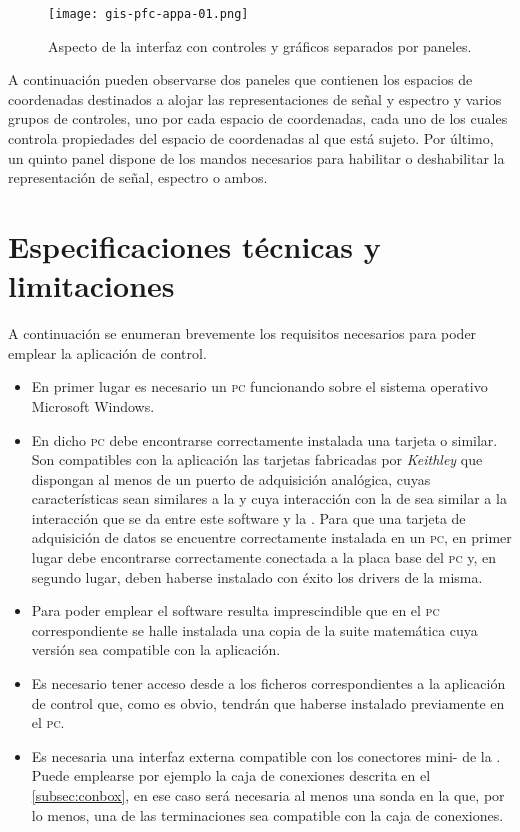 \begin{figure}
	\begin{center}
		\texttt{[image: gis-pfc-appa-01.png]}
	\end{center}
	\caption[Aspecto de la interfaz con controles y gráficos separados
	por paneles]{Aspecto de la interfaz con controles y gráficos
	separados por paneles.}
	\label{fig:interface}
\end{figure}

A continuación pueden observarse dos paneles que contienen los espacios de
coordenadas destinados a alojar las representaciones de señal y espectro y
varios grupos de controles, uno por cada espacio de coordenadas, cada uno
de los cuales controla propiedades del espacio de coordenadas al que está
sujeto. Por último, un quinto panel dispone de los mandos necesarios para
habilitar o deshabilitar la representación de señal, espectro o ambos.


\section{Especificaciones técnicas y limitaciones}

A continuación se enumeran brevemente los requisitos necesarios para poder
emplear la aplicación de control.

\begin{itemize}
	\item En primer lugar es necesario un \textsc{pc} funcionando sobre
		el sistema operativo Microsoft Windows.
	\item En dicho \textsc{pc} debe encontrarse correctamente instalada
		una tarjeta \kpci{} o similar. Son compatibles con la
		aplicación las tarjetas fabricadas por \emph{Keithley} que
		dispongan al menos de un puerto de adquisición analógica,
		cuyas características sean similares a la \kpci{} y cuya
		interacción con la \datx{} de \matlab{} sea similar a la
		interacción que se da entre este software y la \kpci{}.
		Para que una tarjeta de adquisición de datos se encuentre
		correctamente instalada en un \textsc{pc}, en primer lugar
		debe encontrarse correctamente conectada a la placa base
		del \textsc{pc} y, en segundo lugar, deben haberse
		instalado con éxito los drivers de la misma.
	\item Para poder emplear el software resulta imprescindible que en
		el \textsc{pc} correspondiente se halle instalada una copia
		de la suite matemática \matlab{} cuya versión sea
		compatible con la aplicación.
	\item Es necesario tener acceso desde \matlab{} a los ficheros
		correspondientes a la aplicación de control que, como es
		obvio, tendrán que haberse instalado previamente en el
		\textsc{pc}.
	\item Es necesaria una interfaz externa compatible con los
		conectores mini- de la \kpci{}. Puede emplearse por
		ejemplo la caja de conexiones descrita en el
		\vref{subsec:conbox}, en ese caso será necesaria al menos
		una sonda en la que, por lo menos, una de las terminaciones
		sea compatible con la caja de conexiones.
\end{itemize}

